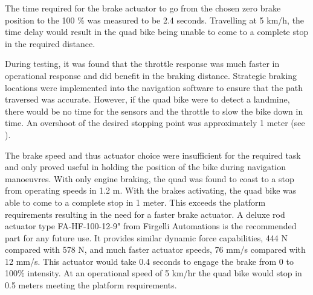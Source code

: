 \documentclass[main.tex]{subfiles}
\begin{document}
The time required for the brake actuator to go from the chosen zero brake position to the 100 \% was measured to be 2.4 seconds. Travelling at 5 km/h, the time delay would result in the quad bike being unable to come to a complete stop in the required distance. %

During testing, it was found that the throttle response was much faster in operational response and did benefit in the braking distance. Strategic braking locations were implemented into the navigation software to ensure that the path traversed was accurate. However, if the quad bike were to detect a landmine, there would be no time for the sensors and the throttle to slow the bike down in time. An overshoot of the desired stopping point was approximately 1 meter (see ).

The brake speed and thus actuator choice were insufficient for the required task and only proved useful in holding the position of the bike during navigation manoeuvres. With only engine braking, the quad was found to coast to a stop from operating speeds in 1.2 m. With the brakes activating, the quad bike was able to come to a complete stop in 1 meter. This exceeds the platform requirements resulting in the need for a faster brake actuator. A deluxe rod actuator type FA-HF-100-12-9" from Firgelli Automations is the recommended part for any future use. It provides similar dynamic force capabilities, 444 N compared with 578 N, and much faster actuator speeds, 76 mm/s compared with 12 mm/s. This actuator would take 0.4 seconds to engage the brake from 0 to 100\% intensity. At an operational speed of 5 km/hr the quad bike would stop in 0.5 meters meeting the platform requirements.
\end{document}
